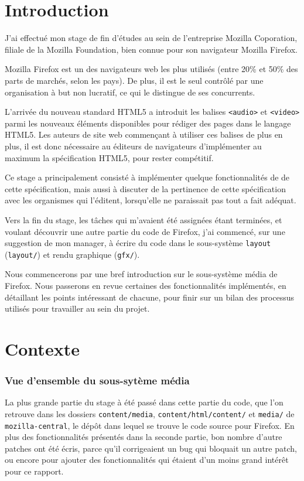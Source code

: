 \documentclass[a4paper,10pt]{article}
\newcommand{\cc}[1]{\texttt{#1}}
\begin{document}
\begin{multicols}{2}
  \part{Introduction}
  J'ai effectué mon stage de fin d'études au sein de l'entreprise Mozilla
  Coporation, filiale de la Mozilla Foundation, bien connue pour son navigateur
  Mozilla Firefox.

  Mozilla Firefox est un des navigateurs web les plus utilisés (entre 20\% et 50\%
  des parts de marchés, selon les pays). De plus, il est le seul contrôlé par
  une organisation à but non lucratif, ce qui le distingue de ses concurrents.

  L'arrivée du nouveau standard HTML5\cite{HTML} a introduit les balises \cc{<audio>}
  et \cc{<video>} parmi les nouveaux éléments disponibles pour rédiger des pages
  dans le langage HTML5. Les auteurs de site web commençant à utiliser
  ces balises de plus en plus, il est donc nécessaire au éditeurs de navigateurs
  d'implémenter au maximum la spécification HTML5, pour rester compétitif.

  Ce stage a principalement consisté à implémenter quelque fonctionnalités de de
  cette spécification, mais aussi à discuter de la pertinence de cette
  spécification avec les organismes qui l'éditent, lorsqu'elle ne paraissait
  pas tout a fait adéquat.

  Vers la fin du stage, les tâches qui m'avaient été assignées étant terminées,
  et voulant découvrir une autre partie du code de Firefox, j'ai commencé, sur
  une suggestion de mon manager, à écrire du code dans le sous-système
  \cc{layout} (\cc{layout/}) et rendu graphique (\cc{gfx/}).

  Nous commencerons par une bref introduction sur le sous-système média de
  Firefox. Nous passerons en revue certaines des fonctionnalités implémentés, en
  détaillant les points intéressant de chacune, pour finir sur un bilan des
  processus utilisés pour travailler au sein du projet.

  \part{Contexte}
  \section{Vue d'ensemble du sous-sytème média}
  La plus grande partie du stage à été passé dans cette partie du code, que l'on
  retrouve dans les dossiers \cc{content/media}, \cc{content/html/content/} et
  \cc{media/} de \cc{mozilla-central}, le dépôt dans lequel se trouve le code
  source pour Firefox. En plus des fonctionnalités présentés dans la seconde
  partie, bon nombre d'autre patches ont été écris, parce qu'il corrigeaient un
  bug qui \og bloquait \fg un autre patch, ou encore pour ajouter des
  fonctionnalités qui étaient d'un moins grand intérêt pour ce rapport.


\end{multicols}
\end{document}
